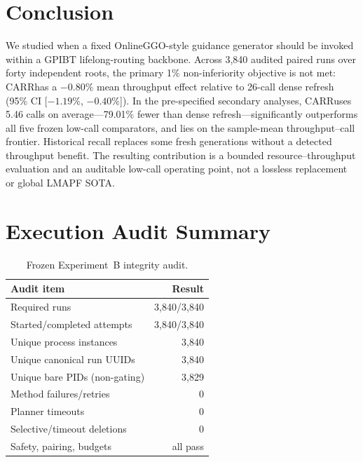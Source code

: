 \documentclass[sigconf,anonymous,review]{acmart}
\newcommand{\carr}{\textsc{CARR}}
\begin{document}
\section{Conclusion}

We studied when a fixed OnlineGGO-style guidance generator should be invoked
within a GPIBT lifelong-routing backbone. Across 3{,}840 audited paired runs
over forty independent roots, the primary 1\% non-inferiority objective is not
met: \carr has a $-0.80\%$ mean throughput effect relative to 26-call dense
refresh (95\% CI [$-1.19\%$, $-0.40\%$]). In the pre-specified secondary
analyses, \carr uses 5.46 calls on average---79.01\% fewer than dense
refresh---significantly outperforms all five frozen low-call comparators, and
lies on the sample-mean throughput--call frontier. Historical recall replaces
some fresh generations without a detected throughput benefit. The resulting
contribution is a bounded resource--throughput evaluation and an auditable
low-call operating point, not a lossless replacement or global LMAPF SOTA.




\appendix

\section{Execution Audit Summary}

\begin{table}[h]
\caption{Frozen Experiment~B integrity audit.}
\centering
\small
\begin{tabular}{lr}
\toprule
Audit item & Result \\
\midrule
Required runs & 3{,}840/3{,}840 \\
Started/completed attempts & 3{,}840/3{,}840 \\
Unique process instances & 3{,}840 \\
Unique canonical run UUIDs & 3{,}840 \\
Unique bare PIDs (non-gating) & 3{,}829 \\
Method failures/retries & 0 \\
Planner timeouts & 0 \\
Selective/timeout deletions & 0 \\
Safety, pairing, budgets & all pass \\
\bottomrule
\end{tabular}
\end{table}
\end{document}
